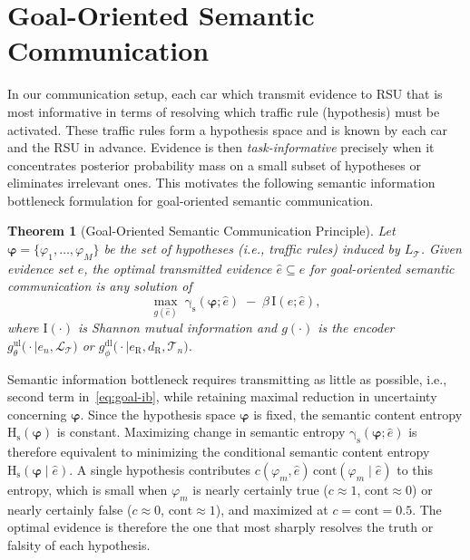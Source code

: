 \documentclass[10pt, conference, letterpaper]{ IEEEtran}
\theoremstyle{bfnote}
\newtheorem{theorem}{Theorem}
\begin{document}
\section{Goal-Oriented Semantic Communication}

In our communication setup, each car which transmit evidence to RSU that is most informative in terms of resolving which traffic rule (hypothesis) must be activated. These traffic rules form a hypothesis space and is known by each car and the RSU in advance. Evidence is then \emph{task-informative} precisely when it concentrates posterior probability mass on a small subset of hypotheses or eliminates irrelevant ones. This motivates the following semantic information bottleneck formulation for goal-oriented semantic communication.

\begin{theorem}[Goal-Oriented Semantic Communication Principle]
\label{thm:goal-oriented-semantic}
Let $\boldsymbol{\varphi} = \{\varphi_1, \dots, \varphi_M\}$ be the set of hypotheses (i.e., traffic rules) induced by $L_{\mathcal{T}}$. Given evidence set $e$, the optimal transmitted evidence $\hat e \subseteq e$ for goal-oriented semantic communication is any solution of
\begin{equation}
\label{eq:goal-ib}
\max_{g(\hat e)} \; \mathrm{\gamma_s}(\boldsymbol{\varphi}; \hat{e}) \;-\; \beta\, \mathrm{I}(e; \hat{e}),
\end{equation}
where $\mathrm{I}(\cdot)$ is Shannon mutual information and $g(\cdot)$ is the encoder $g_{\theta}^{\mathrm{ul}}
\bigl(\cdot\mid e_n,\mathcal{L}_{\mathcal T}\bigr)$ or $g_{\phi}^{\mathrm{dl}}
\bigl(\cdot\mid e_{\mathrm R}, d_{\mathrm R},\mathcal{T}_n\bigr)$. 
\end{theorem}

Semantic information bottleneck requires transmitting as little as possible, i.e., second term in~\eqref{eq:goal-ib}, while retaining maximal reduction in uncertainty concerning $\boldsymbol{\varphi}$. Since the hypothesis space $\boldsymbol{\varphi}$ is fixed, the semantic content entropy $\mathrm{H_s}(\boldsymbol{\varphi})$ is constant. Maximizing change in semantic entropy $\mathrm{\gamma_s}(\boldsymbol{\varphi}; \hat{e})$ is therefore equivalent to minimizing the conditional semantic content entropy $\mathrm{H_s}(\boldsymbol{\varphi} \mid \hat{e})$. A single hypothesis contributes $c(\varphi_m, \hat e)\,\mathrm{cont}(\varphi_m \mid \hat e)$ to this entropy, which is small when $\varphi_m$ is nearly certainly true ($c \approx 1$, $\mathrm{cont} \approx 0$) or nearly certainly false ($c \approx 0$, $\mathrm{cont} \approx 1$), and maximized at $c = \mathrm{cont} = 0.5$. The optimal evidence is therefore the one that most sharply resolves the truth or falsity of each hypothesis.
\end{document}

